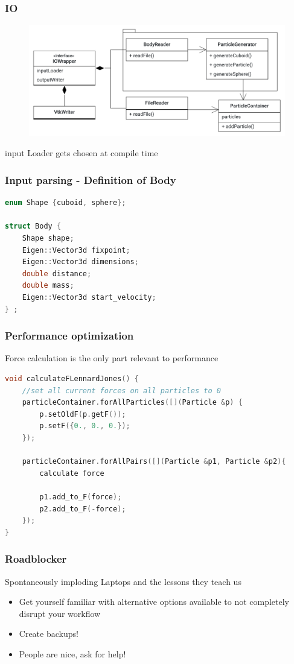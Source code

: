 \begin{frame}
	\frametitle{IO}
	\begin{figure}
		\centering
		\includegraphics[width=0.7\linewidth]{IOWrapper}
		\label{fig:iowrapper}
	\end{figure}
	\large
	\centering
	input Loader gets chosen at compile time
\end{frame}


\begin{frame}[fragile]
\frametitle{Input parsing - Definition of Body}
\vspace{0.7cm}

\begin{lstlisting}[language=C++]
enum Shape {cuboid, sphere};

struct Body {
	Shape shape;   
	Eigen::Vector3d fixpoint; 
	Eigen::Vector3d dimensions; 
	double distance;
	double mass;
	Eigen::Vector3d start_velocity;
} ;
\end{lstlisting}
\end{frame}

\begin{frame}[fragile]
	\frametitle{Performance optimization}
	\large
	Force calculation is the only part relevant to performance
	\begin{lstlisting}[language=C++]
    void calculateFLennardJones() {
	//set all current forces on all particles to 0
	particleContainer.forAllParticles([](Particle &p) {
		p.setOldF(p.getF());
		p.setF({0., 0., 0.});
	});
	
	particleContainer.forAllPairs([](Particle &p1, Particle &p2){
		calculate force 
		
		p1.add_to_F(force);
		p2.add_to_F(-force);
	});
}

	\end{lstlisting}

\end{frame}

\begin{frame}
	\frametitle{Roadblocker}
	\Large
	Spontaneously imploding Laptops and the lessons they teach us
	\large
	\begin{itemize}
		\item<1-> Get yourself familiar with alternative options available to not completely disrupt your workflow
		\item<2-> Create backups!
		\item<3-> People are nice, ask for help!
	\end{itemize}
	
\end{frame}

